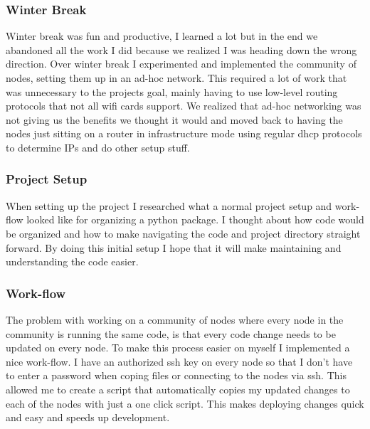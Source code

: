 \documentclass[draftclsnofoot, onecolumn, compsoc, 10pt]{IEEEtran}
\begin{document}
\subsubsection{Winter Break}
Winter break was fun and productive, I learned a lot but in the end we abandoned all the work I did because we realized I was heading down the wrong direction. Over winter break I experimented and implemented the community of nodes, setting them up in an ad-hoc network. This required a lot of work that was unnecessary to the projects goal, mainly having to use low-level routing protocols that not all wifi cards support. We realized that ad-hoc networking was not giving us the benefits we thought it would and moved back to having the nodes just sitting on a router in infrastructure mode using regular dhcp protocols to determine IPs and do other setup stuff.

\subsubsection{Project Setup}
When setting up the project I researched what a normal project setup and work-flow looked like for organizing a python package. I thought about how code would be organized and how to make navigating the code and project directory straight forward. By doing this initial setup I hope that it will make maintaining and understanding the code easier. 

\subsubsection{Work-flow}
The problem with working on a community of nodes where every node in the community is running the same code, is that every code change needs to be updated on every node. To make this process easier on myself I implemented a nice work-flow. I have an authorized ssh key on every node so that I don't have to enter a password when coping files or connecting to the nodes via ssh. This allowed me to create a script that automatically copies my updated changes to each of the nodes with just a one click script. This makes deploying changes quick and easy and speeds up development.
\end{document}
